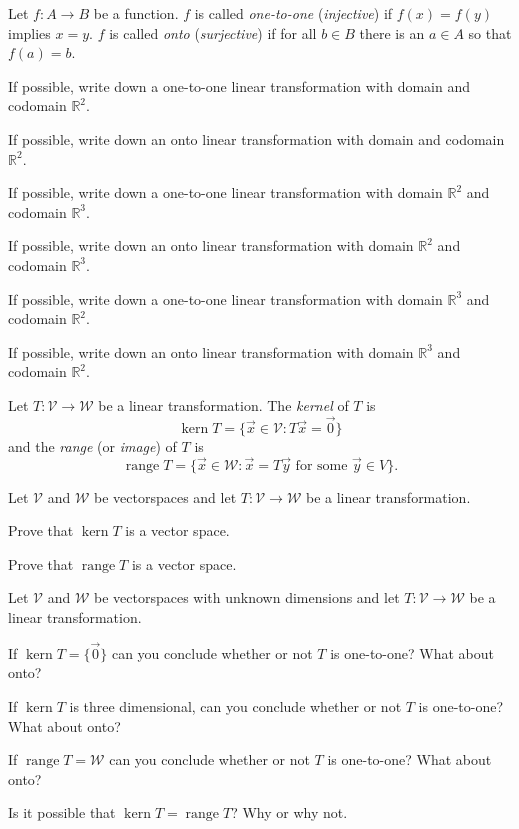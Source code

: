\documentclass[14pt]{problemset}
\newcommand{\R}{\mathbb{R}}
\newcommand{\Kern}{\operatorname{kern}}
\newcommand{\Range}{\operatorname{range}}
\begin{document}
	\newpage
	\begin{definition}
		Let $f:A\to B$ be a function. $f$ is called \emph{one-to-one} (\emph{injective}) if
		$f(x)=f(y)$ implies $x=y$. $f$ is called \emph{onto} (\emph{surjective}) if for all
		$b\in B$ there is an $a\in A$ so that $f(a)=b$.
	\end{definition}

	\question
	\begin{parts}
		\item If possible, write down a one-to-one linear transformation with domain and codomain $\R^2$.
		\item If possible, write down an onto linear transformation with domain and codomain $\R^2$.
		\item If possible, write down a one-to-one linear transformation with domain $\R^2$ and codomain $\R^3$.
		\item If possible, write down an onto linear transformation with domain $\R^2$ and codomain $\R^3$.
		\item If possible, write down a one-to-one linear transformation with domain $\R^3$ and codomain $\R^2$.
		\item If possible, write down an onto linear transformation with domain $\R^3$ and codomain $\R^2$.
	\end{parts}

	\begin{definition}
		Let $T:\mathcal V\to\mathcal W$ be a linear transformation. The \emph{kernel} of $T$ is
		\[
			\Kern T = \{\vec x\in \mathcal V: T\vec x=\vec 0\}
		\]
		and the \emph{range} (or \emph{image}) of $T$ is
		\[
			\Range T = \{\vec x\in \mathcal W: \vec x=T\vec y\text{ for some }\vec y\in V\}.
		\]
	\end{definition}
	
	\question
		Let $\mathcal V$ and $\mathcal W$ be vectorspaces and let
		$T:\mathcal V\to\mathcal W$ be a linear transformation.
	\begin{parts}
		\item Prove that $\Kern T$ is a vector space.
		\item Prove that $\Range T$ is a vector space.
	\end{parts}

	\question
		Let $\mathcal V$ and $\mathcal W$ be vectorspaces with unknown dimensions and let
		$T:\mathcal V\to\mathcal W$ be a linear transformation.
	\begin{parts}
		\item If $\Kern T = \{\vec 0\}$ can you conclude whether or not $T$ is one-to-one?
			What about onto?
		\item If $\Kern T$ is three dimensional, can you conclude whether or not $T$ is one-to-one?
			What about onto?
		\item If $\Range T = \mathcal W$ can you conclude whether or not $T$ is one-to-one?
			What about onto?
		\item Is it possible that $\Kern T=\Range T$? Why or why not.
	\end{parts}
\end{document}
